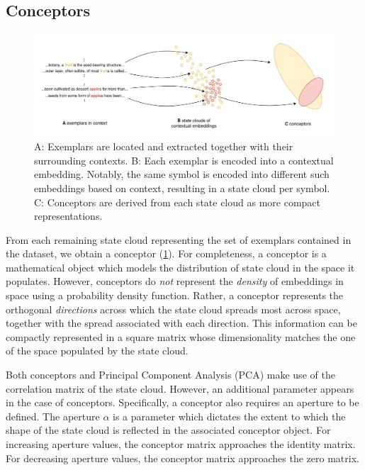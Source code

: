 \subsection{Conceptors}

\begin{figure}[h]
    \centering
    \includegraphics[width=\textwidth]{img/exemplars-conceptors.png}
    \caption{A: Exemplars are located and extracted together with their surrounding contexts. B: Each exemplar is encoded into a contextual embedding. Notably, the same symbol is encoded into different such embeddings based on context, resulting in a state cloud per symbol. C: Conceptors are derived from each state cloud as more compact representations.}\label{fig:exemplars-conceptors}
\end{figure}

From each remaining state cloud representing the set of exemplars contained in the dataset, we obtain a conceptor \citep{jaeger_controlling_2017} (\ref{fig:exemplars-conceptors}). For completeness, a conceptor is a mathematical object which models the distribution of state cloud in the space it populates. However, conceptors do \textit{not} represent the \textit{density} of embeddings in space using a probability density function. Rather, a conceptor represents the orthogonal \textit{directions} across which the state cloud spreads most across space, together with the spread associated with each direction. This information can be compactly represented in a square matrix whose dimensionality matches the one of the space populated by the state cloud.

Both conceptors and Principal Component Analysis (PCA) make use of the correlation matrix of the state cloud. However, an additional parameter appears in the case of conceptors. Specifically, a conceptor also requires an aperture to be defined. The aperture $\alpha$ is a parameter which dictates the extent to which the shape of the state cloud is reflected in the associated conceptor object. For increasing aperture values, the conceptor matrix approaches the identity matrix. For decreasing aperture values, the conceptor matrix approaches the zero matrix.


